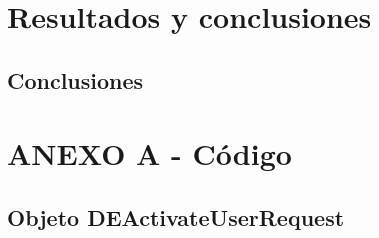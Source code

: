 \documentclass[a4paper, 12pt]{article}
\begin{document}
\section{Resultados y conclusiones}
\label{sec-5}
\subsection{Conclusiones}
\label{sec-5-1}

\printbibliography[heading=bibnumbered] %

\section{ANEXO A - Código}
\label{sec-6}
\subsection{Objeto DEActivateUserRequest}
\label{sec-6-1}
\end{document}
